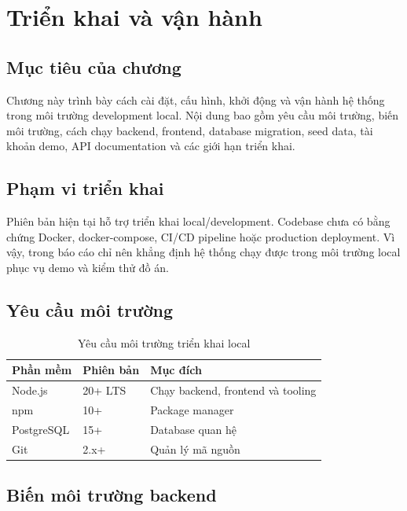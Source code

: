 \chapter{Triển khai và vận hành}

\section{Mục tiêu của chương}

Chương này trình bày cách cài đặt, cấu hình, khởi động và vận hành hệ thống trong môi trường development local. Nội dung bao gồm yêu cầu môi trường, biến môi trường, cách chạy backend, frontend, database migration, seed data, tài khoản demo, API documentation và các giới hạn triển khai.

\section{Phạm vi triển khai}

Phiên bản hiện tại hỗ trợ triển khai local/development. Codebase chưa có bằng chứng Docker, docker-compose, CI/CD pipeline hoặc production deployment. Vì vậy, trong báo cáo chỉ nên khẳng định hệ thống chạy được trong môi trường local phục vụ demo và kiểm thử đồ án.


\section{Yêu cầu môi trường}

\begin{table}[H]
\centering
\caption{Yêu cầu môi trường triển khai local}
\begin{tabularx}{\textwidth}{|p{4cm}|p{3cm}|X|}
\hline
\textbf{Phần mềm} & \textbf{Phiên bản} & \textbf{Mục đích} \\
\hline
Node.js & 20+ LTS & Chạy backend, frontend và tooling \\
\hline
npm & 10+ & Package manager \\
\hline
PostgreSQL & 15+ & Database quan hệ \\
\hline
Git & 2.x+ & Quản lý mã nguồn \\
\hline
\end{tabularx}
\end{table}

\section{Biến môi trường backend}

